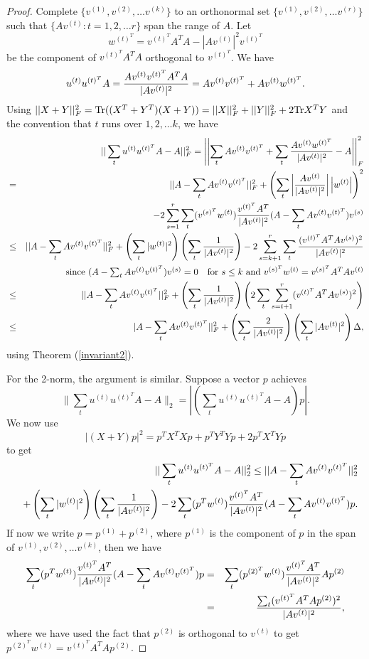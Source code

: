 \documentclass{book}
\numberwithin{exercise}{chapter}
\begin{document}
\begin{proof}

Complete $\{ v^{(1)},v^{(2)},\ldots v^{(k)}\}$  to an orthonormal set
$\{ v^{(1)},v^{(2)},\ldots v^{(r)}\}$  such that $\{ Av^{(t)}:t=1,2,\ldots r\}$
span the range of $A$. Let
$$w^{(t)^T}=v^{(t)^T}A^TA-|Av^{(t)}|^2v^{(t)^T} $$
be the component of $v^{(t)^T}A^TA$ orthogonal to $v^{(t)^T}$.
We have $$u^{(t)}u^{(t)^T}A={Av^{(t)}v^{(t)^T}A^TA\over |Av^{(t)}|^2
}=Av^{(t)}v^{(t)^T}+Av^{(t)}w^{(t)^T}.$$
Using $||X+Y||_F^2=\hbox{Tr} ((X^T+Y^T)(X+Y))=||X||_F^2+||Y||_F^2+2\hbox{Tr} X^TY$
and the convention that $t$ runs over $1,2,\ldots k$, we have
\begin{eqnarray*}
&&||\sum_t u^{(t)}u^{(t)^T}A-A||_F^2=\left|\left|\sum_t Av^{(t)}v^{(t)^T}+\sum_t{Av^{(t)}w^{(t)^T}\over |Av^{(t)}|^2} -A\right|\right|_F^2\\
&=& ||A-\sum_t Av^{(t)}v^{(t)^T} ||_F^2+\left( \sum_t \left| {Av^{(t)}\over |Av^{(t)}|^2}\right|\left| w^{(t)}\right|\right)^2\\
&&\qquad -2\sum_{s=1}^r\sum_t(v^{(s)^T}w^{(t)}){v^{(t)^T}A^T\over |Av^{(t)}|^2}(A-\sum_t Av^{(t)}v^{(t)^T})v^{(s)}
\\
&\leq& ||A-\sum_t Av^{(t)}v^{(t)^T} ||_F^2+
\left( \sum_t|w^{(t)}|^2\right)\left(\sum_t{1\over |Av^{(t)}|^2}\right)
-2\sum_{s=k+1}^r\sum_t{(v^{(t)^T}A^TAv^{(s)})^2\over|Av^{(t)}|^2}\\
&&\qquad \hbox{since $(A-\sum_t Av^{(t)}v^{(t)^T})v^{(s)}=0\quad\hbox{for } s\leq k$
and $v^{(s)^T}w^{(t)}=v^{(s)^T}A^TAv^{(t)}$}\\
&\leq& ||A-\sum_t Av^{(t)}v^{(t)^T} ||_F^2+\left(\sum_t{1\over |Av^{(t)}|^2}\right)
\left(2\sum_t\sum_{s=t+1}^r(v^{(t)^T}A^TAv^{(s)})^2\right)\\
&\leq& |A-\sum_t Av^{(t)}v^{(t)^T} ||_F^2+\left(\sum_t{2\over |Av^{(t)}|^2}\right)\left(\sum_t |Av^{(t)}|^2\right)
\Delta ,
\end{eqnarray*}
using Theorem (\ref{invariant2}).

For the 2-norm, the argument is similar. Suppose a vector $p$ achieves
\[
\|\sum_t u^{(t)}u^{(t)^T}A-A\|_2=|(\sum_t u^{(t)}u^{(t)^T}A-A)p|.
\]
We now use
\[
|(X+Y)p|^2=p^TX^TXp+p^TY^TYp+2p^TX^TYp
\]
to get
\begin{eqnarray*}
&&||\sum_t u^{(t)}u^{(t)^T}A-A||_2^2
\leq ||A-\sum_t Av^{(t)}v^{(t)^T} ||_2^2
\\&&+
\left( \sum_t|w^{(t)}|^2\right)\left(\sum_t{1\over |Av^{(t)}|^2}\right)
-2\sum_t(p^Tw^{(t)}){v^{(t)^T}A^T\over |Av^{(t)}|^2}(A-\sum_t Av^{(t)}v^{(t)^T})p.
\end{eqnarray*}
If now we write $p=p^{(1)}+p^{(2)}$, where $p^{(1)}$ is the component of $p$ in the span of $v^{(1)},v^{(2)},\ldots v^{(k)}$, then we have
\begin{eqnarray*}
\sum_t(p^Tw^{(t)}){v^{(t)^T}A^T\over |Av^{(t)}|^2}(A-\sum_t Av^{(t)}v^{(t)^T})p
&=& \sum_t(p^{(2)^T}w^{(t)}){v^{(t)^T}A^T\over |Av^{(t)}|^2}Ap^{(2)}\\
&=&{\sum_t (v^{(t)^T}A^TAp^{(2)})^2\over |Av^{(t)}|^2},
\end{eqnarray*}
where we have used the fact that $p^{(2)}$ is orthogonal to $v^{(t)}$ to get $p^{(2)^T}w^{(t)}=v^{(t)^T}A^TAp^{(2)}$.

\end{proof}
\end{document}

